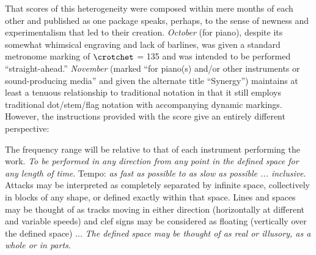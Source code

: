     That scores of this heterogeneity were composed within mere months of each other and published as one package speaks, perhaps, to the sense of newness and experimentalism that led to their creation. \textit{October} (for piano), despite its somewhat whimsical engraving and lack of barlines, was given a standard metronome marking of $\crotchet$ = 135 and was intended to be performed ``straight-ahead.'' \textit{November} (marked ``for piano(s) and/or other instruments or sound-producing media'' and given the alternate title ``Synergy'') maintains at least a tenuous relationship to traditional notation in that it still employs traditional dot/stem/flag notation with accompanying dynamic markings. However, the instructions provided with the score give an entirely different perspective:

    \begin{smallquote}
    The frequency range will be relative to that of each instrument performing the work. \textit{To be performed in any direction from any point in the defined space for any length of time}. Tempo:\textit{ as fast as possible to as slow as possible ... inclusive}. Attacks may be interpreted as completely separated by infinite space, collectively in blocks of any shape, or defined exactly within that space. Lines and spaces may be thought of as tracks moving in either direction (horizontally at different and variable speeds) and clef signs may be considered as floating (vertically over the defined space) ...\textit{ The defined space may be thought of as real or illusory, as a whole or in parts}.\autocite[1]{Brown_1986}
    \end{smallquote}

